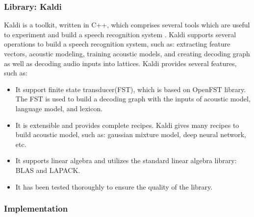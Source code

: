 \subsubsection{Library: Kaldi}
Kaldi is a toolkit, written in C++, which comprises several tools which are useful to experiment and build a speech recognition system \cite{Povey_ASRU2011}. Kaldi supports several operations to build a speech recognition system, such as: extracting feature vectors, acoustic modeling, training acoustic models, and creating decoding graph as well as decoding audio inputs into lattices. Kaldi provides several features, such as:
\begin{itemize}
\item It support finite state transducer(FST), which is based on OpenFST library. The FST is used to build a decoding graph with the inputs of acoustic model, language model, and lexicon.
\item It is extensible and provides complete recipes. Kaldi gives many recipes to build acoustic model, such as: gaussian mixture model, deep neural network, etc.
\item It supports linear algebra and utilizes the standard linear algebra library: BLAS and LAPACK.
\item It has been tested thoroughly to ensure the quality of the library.
\end{itemize}

\subsubsection{Implementation}

% 

